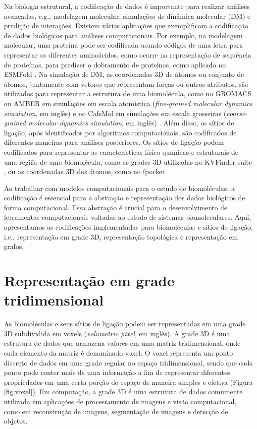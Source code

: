 \documentclass[Portugues]{phdquali}
\def\ie{i.e.\onedot}
\def\eg{e.g.\onedot}
\begin{document}
Na biologia estrutural, a codificação de dados é importante para realizar análises avançadas, \eg, modelagem molecular, simulações de dinâmica molecular (DM) e predição de interações. Existem várias aplicações que exemplificam a codificação de dados biológicos para análises computacionais. Por exemplo, na modelagem molecular, uma proteína pode ser codificada usando códigos de uma letra para representar os diferentes aminoácidos, como ocorre na representação de sequência de proteínas, para predizer o dobramento de proteínas, como aplicado no ESMFold \cite{lin2022}. Na simulação de DM, as coordenadas 3D de átomos ou conjunto de átomos, juntamente com vetores que representam forças ou outros atributos, são utilizados para representar a estrutura de uma biomolécula, como no GROMACS \cite{gromacs} ou AMBER \cite{amber} em simulações em escala atomística (\textit{fine-grained molecular dynamics simulation}, em inglês) e no CafeMol em simulações em escala grosseiras (\textit{coarse-grained molecular dynamics simulation}, em inglês) \cite{kenzaki2011}. Além disso, os sítios de ligação, após identificados por algoritmos computacionais, são codificados de diferentes maneiras para análises posteriores. Os sítios de ligação podem codificados para representar as características físico-químicas e estruturais de uma região de uma biomolécula, como as grades 3D utilizadas no KVFinder suite \cite{oliveira2014,guerra2020,guerra2021,guerra2023B}, ou as coordenadas 3D dos átomos, como no fpocket \cite{fpocket}.

Ao trabalhar com modelos computacionais para o estudo de biomoléculas, a codificação é essencial para a abstração e representação dos dados biológicos de forma computacional. Essa abstração é crucial para o desenvolvimento de ferramentas computacionais voltadas ao estudo de sistemas biomoleculares. Aqui, apresentamos as codificações implementadas para biomoléculas e sítios de ligação, \ie, representação em grade 3D, representação topológica e representação em grafos.

\section{Representação em grade tridimensional}

As biomoléculas e seus sítios de ligação podem ser representadas em uma grade 3D subdividida em voxels (\textit{volumetric pixel}, em inglês). A grade 3D é uma estrutura de dados que armazena valores em uma matriz tridimensional, onde cada elemento da matriz é denominado voxel. O voxel representa um ponto discreto de dados em uma grade regular no espaço tridimensional, sendo que cada ponto pode conter mais de uma informação a fim de representar diferentes propriedades em uma certa porção de espaço de maneira simples e efetiva (Figura \ref{fig:voxel}). Em computação, a grade 3D é uma estrutura de dados comumente utilizada em aplicações de processamento de imagens e visão computacional, como em reconstrução de imagens, segmentação de imagens e detecção de objetos. 
\end{document}
